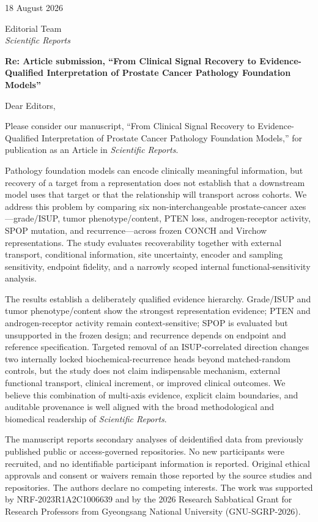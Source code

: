 \documentclass[11pt,a4paper]{article}
\begin{document}
18 August 2026

Editorial Team\\
\textit{Scientific Reports}

\textbf{Re: Article submission, ``From Clinical Signal Recovery to Evidence-Qualified
Interpretation of Prostate Cancer Pathology Foundation Models''}

Dear Editors,

Please consider our manuscript, ``From Clinical Signal Recovery to Evidence-Qualified
Interpretation of Prostate Cancer Pathology Foundation Models,'' for publication
as an Article in \textit{Scientific Reports}.

Pathology foundation models can encode clinically meaningful information, but recovery of a
target from a representation does not establish that a downstream model uses that target or
that the relationship will transport across cohorts. We address this problem by comparing six
non-interchangeable prostate-cancer axes---grade/ISUP, tumor phenotype/content, PTEN loss,
androgen-receptor activity, SPOP mutation, and recurrence---across frozen CONCH and Virchow
representations. The study evaluates recoverability together with external transport,
conditional information, site uncertainty, encoder and sampling sensitivity, endpoint
fidelity, and a narrowly scoped internal functional-sensitivity analysis.

The results establish a deliberately qualified evidence hierarchy. Grade/ISUP and tumor
phenotype/content show the strongest representation evidence; PTEN and androgen-receptor
activity remain context-sensitive; SPOP is evaluated but unsupported in the frozen design;
and recurrence depends on endpoint and reference specification. Targeted removal of an
ISUP-correlated direction changes two internally locked biochemical-recurrence heads beyond
matched-random controls, but the study does not claim indispensable mechanism, external
functional transport, clinical increment, or improved clinical outcomes. We believe this
combination of multi-axis evidence, explicit claim boundaries, and auditable provenance is
well aligned with the broad methodological and biomedical readership of
\textit{Scientific Reports}.

The manuscript reports secondary analyses of deidentified data from previously published
public or access-governed repositories. No new participants were recruited, and no identifiable
participant information is reported. Original ethical approvals and consent or waivers remain
those reported by the source studies and repositories. The authors declare no competing
interests. The work was supported by NRF-2023R1A2C1006639 and by the 2026 Research Sabbatical
Grant for Research Professors from Gyeongsang National University (GNU-SGRP-2026).
\end{document}
